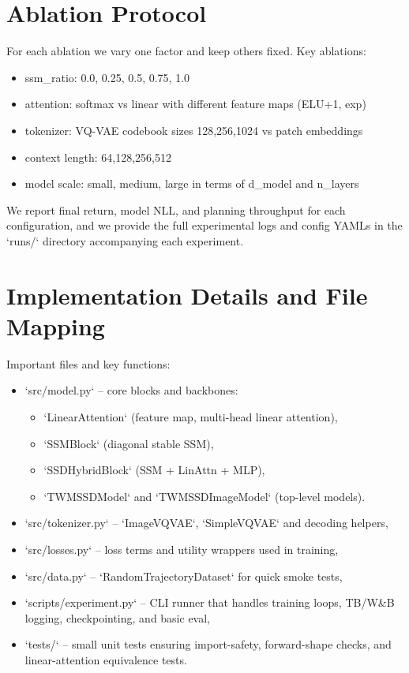 \documentclass{article}
\begin{document}
\section{Ablation Protocol}
For each ablation we vary one factor and keep others fixed. Key ablations:
\begin{itemize}
  \item ssm\_ratio: {0.0, 0.25, 0.5, 0.75, 1.0}
  \item attention: softmax vs linear with different feature maps (ELU+1, exp)
  \item tokenizer: VQ-VAE codebook sizes {128,256,1024} vs patch embeddings
  \item context length: {64,128,256,512}
  \item model scale: {small, medium, large} in terms of d\_model and n\_layers
\end{itemize}
We report final return, model NLL, and planning throughput for each configuration, and we provide the full experimental logs and config YAMLs in the `runs/` directory accompanying each experiment.

\section{Implementation Details and File Mapping}
Important files and key functions:
\begin{itemize}
  \item `src/model.py` -- core blocks and backbones:
    \begin{itemize}
      \item `LinearAttention` (feature map, multi-head linear attention),
      \item `SSMBlock` (diagonal stable SSM),
      \item `SSDHybridBlock` (SSM + LinAttn + MLP),
      \item `TWMSSDModel` and `TWMSSDImageModel` (top-level models).
    \end{itemize}
  \item `src/tokenizer.py` -- `ImageVQVAE`, `SimpleVQVAE` and decoding helpers,
  \item `src/losses.py` -- loss terms and utility wrappers used in training,
  \item `src/data.py` -- `RandomTrajectoryDataset` for quick smoke tests,
  \item `scripts/experiment.py` -- CLI runner that handles training loops, TB/W&B logging, checkpointing, and basic eval,
  \item `tests/` -- small unit tests ensuring import-safety, forward-shape checks, and linear-attention equivalence tests.
\end{itemize}
\end{document}
